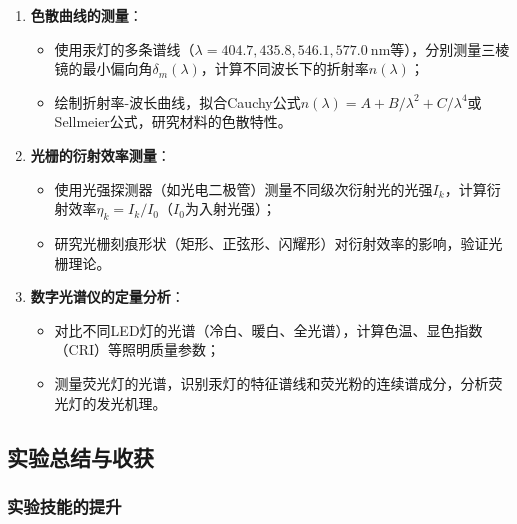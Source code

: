 \documentclass[11pt]{article}
\begin{document}
\begin{enumerate}
    \item \textbf{色散曲线的测量}：
    \begin{itemize}
        \item 使用汞灯的多条谱线（$\lambda = 404.7, 435.8, 546.1, 577.0\ \text{nm}$等），分别测量三棱镜的最小偏向角$\delta_m(\lambda)$，计算不同波长下的折射率$n(\lambda)$；
        \item 绘制折射率-波长曲线，拟合Cauchy公式$n(\lambda) = A + B/\lambda^2 + C/\lambda^4$或Sellmeier公式，研究材料的色散特性。
    \end{itemize}
    
    \item \textbf{光栅的衍射效率测量}：
    \begin{itemize}
        \item 使用光强探测器（如光电二极管）测量不同级次衍射光的光强$I_k$，计算衍射效率$\eta_k = I_k / I_0$（$I_0$为入射光强）；
        \item 研究光栅刻痕形状（矩形、正弦形、闪耀形）对衍射效率的影响，验证光栅理论。
    \end{itemize}
    
    \item \textbf{数字光谱仪的定量分析}：
    \begin{itemize}
        \item 对比不同LED灯的光谱（冷白、暖白、全光谱），计算色温、显色指数（CRI）等照明质量参数；
        \item 测量荧光灯的光谱，识别汞灯的特征谱线和荧光粉的连续谱成分，分析荧光灯的发光机理。
    \end{itemize}
\end{enumerate}

\subsection{实验总结与收获}

\subsubsection{实验技能的提升}
\end{document}
